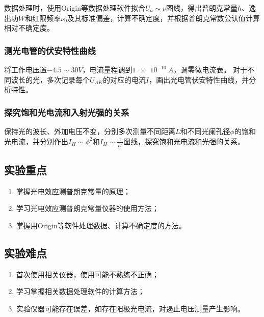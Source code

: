 \documentclass[]{../../templates/Report}%
\begin{document}
数据处理时，使用Origin等数据处理软件拟合$U_a\sim \nu$图线，得出普朗克常量$h$、逸出功$W$和红限频率$\nu_0$及其标准偏差，计算不确定度，并根据普朗克常数公认值计算相对不确定度。

\subsubsection{测光电管的伏安特性曲线}
将工作电压置$-4.5\sim 30\si{V}$，电流量程调到$\SI{1e-10}{A}$，调零微电流表。
对于不同波长的光，多次记录每个$U_{AK}$的对应的电流$I$，画出光电管伏安特性曲线，并分析特性。

\subsubsection{探究饱和光电流和入射光强的关系}
保持光的波长、外加电压不变，分别多次测量不同距离$L$和不同光阑孔径$\phi$的饱和光电流，并分别作出$I_H \sim \phi^2$和$I_H \sim \frac{1}{L^2}$图线，探究饱和光电流和光强的关系。

\subsection{实验重点}
\begin{enumerate}
    \item 掌握光电效应测普朗克常量的原理；
    \item 学习光电效应测普朗克常量仪器的使用方法；
    \item 掌握用Origin等软件处理数据、计算不确定度的方法。
\end{enumerate}

\subsection{实验难点}
\begin{enumerate}
    \item 首次使用相关仪器，使用可能不熟练不正确；
    \item 学习掌握相关数据处理软件的计算方法；
    \item 实验仪器可能存在误差，如存在阳极光电流，对遏止电压测量产生影响。
\end{enumerate}
\end{document}

